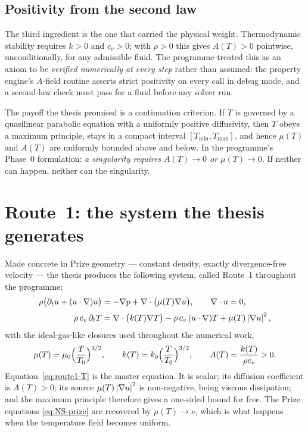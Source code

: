 \subsection{Positivity from the second law}

The third ingredient is the one that carried the physical weight. Thermodynamic
stability requires \(k>0\) and \(c_v>0\); with \(\rho>0\) this gives
\(A(T)>0\) pointwise, unconditionally, for any admissible fluid. The
programme treated this as an axiom to be \emph{verified numerically at every
step} rather than assumed: the property engine's \(A\)-field routine asserts
strict positivity on every call in debug mode, and a second-law check must
pass for a fluid before any solver run.

The payoff the thesis promised is a continuation criterion. If \(T\) is
governed by a quasilinear parabolic equation with a uniformly positive
diffusivity, then \(T\) obeys a maximum principle, stays in a compact interval
\([T_{\min},T_{\max}]\), and hence \(\mu(T)\) and \(A(T)\) are uniformly
bounded above and below. In the programme's Phase~0 formulation: \emph{a
singularity requires \(A(T)\to0\) or \(\mu(T)\to0\)}. If neither can happen,
neither can the singularity.

\section{Route~1: the system the thesis generates}
\label{sec:route1-system}

Made concrete in Prize geometry --- constant density, exactly
divergence-free velocity --- the thesis produces the following system,
called Route~1 throughout the programme:
\begin{align}
  \rho\bigl(\partial_t u + (u\cdot\nabla)u\bigr)
    &= -\nabla p + \nabla\cdot\bigl(\mu(T)\nabla u\bigr),
    \qquad \nabla\cdot u = 0, \label{eq:route1-u}\\[2pt]
  \rho\,c_v\,\partial_t T
    &= \nabla\cdot\bigl(k(T)\nabla T\bigr)
       - \rho\,c_v\,(u\cdot\nabla)T
       + \mu(T)\left|\nabla u\right|^2, \label{eq:route1-T}
\end{align}
with the ideal-gas-like closures used throughout the numerical work,
\[
  \mu(T)=\mu_0\Bigl(\frac{T}{T_0}\Bigr)^{3/2},\qquad
  k(T)=k_0\Bigl(\frac{T}{T_0}\Bigr)^{3/2},\qquad
  A(T)=\frac{k(T)}{\rho c_v}>0 .
\]
Equation~\eqref{eq:route1-T} is the master equation. It is scalar; its
diffusion coefficient is \(A(T)>0\); its source \(\mu(T)\left|\nabla u\right|^2\) is
non-negative, being viscous dissipation; and the maximum principle therefore
gives a one-sided bound for free. The Prize equations \eqref{eq:NS-prize} are
recovered by \(\mu(T)\to\nu\), which is what happens when the temperature
field becomes uniform.

